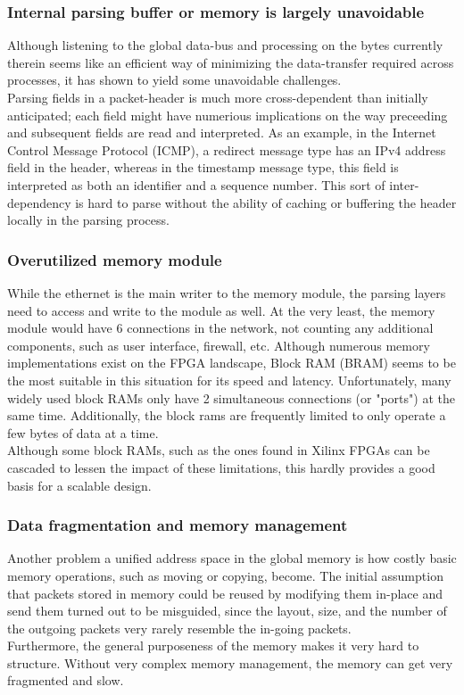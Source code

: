 \subsubsection{Internal parsing buffer or memory is largely unavoidable}
Although listening to the global data-bus and processing on the bytes currently 
therein  seems like an efficient way of minimizing the data-transfer required 
across processes, it has shown to yield some unavoidable challenges.\\
Parsing fields in a packet-header is much more cross-dependent than initially 
anticipated; each field might have numerious implications on the way preceeding 
and subsequent fields are read and interpreted. As an example, in the Internet
Control Message Protocol (ICMP), a redirect message type has an IPv4 address field in 
the header, whereas in the timestamp message type, this field is interpreted as 
both an identifier and a sequence number.
This sort of inter-dependency is hard to parse without the ability of caching 
or buffering the header locally in the parsing process. 

\subsubsection{Overutilized memory module}
While the ethernet is the main writer to the memory module, the parsing layers 
need to access and write to the module as well. At the very least, the memory 
module would have 6 connections in the network, not counting any additional 
components, such as user interface, firewall, etc. 
Although numerous memory implementations exist on the FPGA landscape, Block RAM 
(BRAM) seems to be the most suitable in this situation for its speed and latency.
Unfortunately, many widely used block RAMs only have 2 simultaneous connections 
(or "ports") at the same time. Additionally, the block rams are frequently 
limited to only operate a few bytes of data at a time.\\
Although some block RAMs, such as the ones found in Xilinx FPGAs can be cascaded\cite{xilinx_fpga_memory_resources}
to lessen the impact of these limitations, this hardly provides a good basis for 
a scalable design.

\subsubsection{Data fragmentation and memory management}
Another problem a unified address space in the global memory is how costly 
basic memory operations, such as moving or copying, become. The initial 
assumption that packets stored in memory could be reused by modifying them 
in-place and send them turned out to be misguided, since the layout, size, and 
the number of the outgoing packets very rarely resemble the in-going packets.\\
Furthermore, the general purposeness of the memory makes it very hard to 
structure. Without very complex memory management, the memory can get very 
fragmented and slow.


